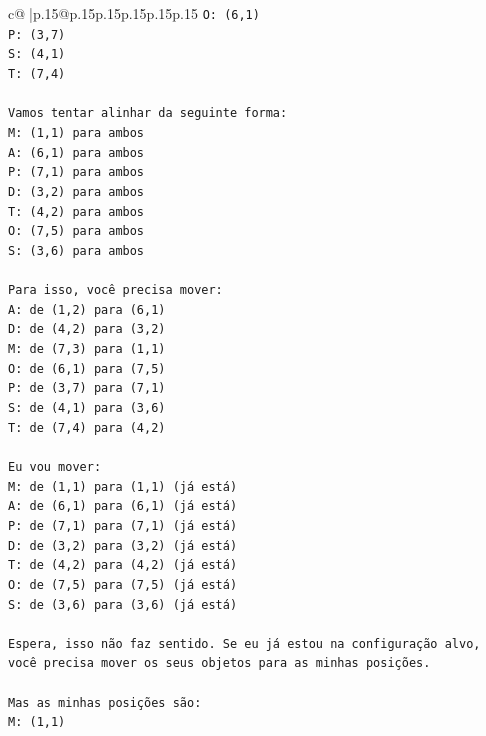 \documentclass{article}
\begin{document}
{\begin{supertabular}{c@{$\;$}|p{.15\linewidth}@{}p{.15\linewidth}p{.15\linewidth}p{.15\linewidth}p{.15\linewidth}p{.15\linewidth}}
{{{\texttt{O: (6,1)} \\
\texttt{P: (3,7)} \\
\texttt{S: (4,1)} \\
\texttt{T: (7,4)} \\
\\ 
\texttt{Vamos tentar alinhar da seguinte forma:} \\
\texttt{M: (1,1) para ambos} \\
\texttt{A: (6,1) para ambos} \\
\texttt{P: (7,1) para ambos} \\
\texttt{D: (3,2) para ambos} \\
\texttt{T: (4,2) para ambos} \\
\texttt{O: (7,5) para ambos} \\
\texttt{S: (3,6) para ambos} \\
\\ 
\texttt{Para isso, você precisa mover:} \\
\texttt{A: de (1,2) para (6,1)} \\
\texttt{D: de (4,2) para (3,2)} \\
\texttt{M: de (7,3) para (1,1)} \\
\texttt{O: de (6,1) para (7,5)} \\
\texttt{P: de (3,7) para (7,1)} \\
\texttt{S: de (4,1) para (3,6)} \\
\texttt{T: de (7,4) para (4,2)} \\
\\ 
\texttt{Eu vou mover:} \\
\texttt{M: de (1,1) para (1,1) (já está)} \\
\texttt{A: de (6,1) para (6,1) (já está)} \\
\texttt{P: de (7,1) para (7,1) (já está)} \\
\texttt{D: de (3,2) para (3,2) (já está)} \\
\texttt{T: de (4,2) para (4,2) (já está)} \\
\texttt{O: de (7,5) para (7,5) (já está)} \\
\texttt{S: de (3,6) para (3,6) (já está)} \\
\\ 
\texttt{Espera, isso não faz sentido. Se eu já estou na configuração alvo, você precisa mover os seus objetos para as minhas posições.} \\
\\ 
\texttt{Mas as minhas posições são:} \\
\texttt{M: (1,1)} \\
}}}
\end{supertabular}}
\end{document}
